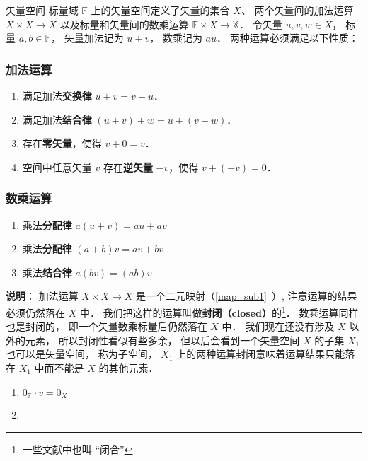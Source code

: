 \begin{definition}{矢量空间}
标量域 $\mathbb F$ 上的矢量空间定义了矢量的集合 $X$、 两个矢量间的加法运算 $X\times X \to X$ 以及标量和矢量间的数乘运算 $\mathbb F \times X \to \mathbb X$． 令矢量 $u,v,w \in X$， 标量 $a,b \in \mathbb F$， 矢量加法记为 $u + v$， 数乘记为 $a u$． 两种运算必须满足以下性质：

\subsubsection{加法运算}
\begin{enumerate}
\item 满足加法\textbf{交换律} $u + v = v + u$．
\item 满足加法\textbf{结合律} $(u + v) + w = u + (v + w)$．
\item 存在\textbf{零矢量}，使得 $v + 0 = v$．
\item 空间中任意矢量 $v$ 存在\textbf{逆矢量} $-v$，使得 $v + (-v) = 0$．
\end{enumerate}

\subsubsection{数乘运算}
\begin{enumerate}
\item 乘法\textbf{分配律} $a(u + v) = au + av$ 
\item 乘法\textbf{分配律} $(a + b)v = av + bv$
\item 乘法\textbf{结合律} $a (b v) = (ab) v$
\end{enumerate}
\end{definition}

\textbf{说明}： 加法运算 $X \times X \to X$ 是一个二元映射（\autoref{map_sub1}~）, 注意运算的结果必须仍然落在 $X$ 中． 我们把这样的运算叫做\textbf{封闭（closed）}的\footnote{一些文献中也叫 “闭合”}． 数乘运算同样也是封闭的， 即一个矢量数乘标量后仍然落在 $X$ 中． 我们现在还没有涉及 $X$ 以外的元素， 所以封闭性看似有些多余， 但以后会看到一个矢量空间 $X$ 的子集 $X_1$ 也可以是矢量空间， 称为子空间， $X_1$ 上的两种运算封闭意味着运算结果只能落在 $X_1$ 中而不能是 $X$ 的其他元素．

\begin{corollary}{}
\begin{enumerate}
\item $0_\mathbb{F}\cdot v=0_{X}$
\item 
\end{enumerate}
\end{corollary}


